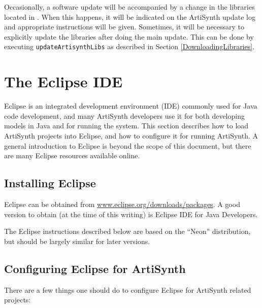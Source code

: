 Occasionally, a software update will be accompanied by a change in the
libraries located in .  When this happens, it will
be indicated on the ArtiSynth update log and appropriate instructions
will be given. Sometimes, it will be necessary to explicitly update
the libraries after doing the main update. This can be done by
executing {\tt updateArtisynthLibs} as described in
Section \ref{DownloadingLibraries}.

\section{The Eclipse IDE}
\label{EclipseIDE}

Eclipse is an integrated development environment (IDE) commonly used
for Java code development, and many ArtiSynth developers use it for
both developing models in Java and for running the system. This section
describes how to load ArtiSynth projects into Eclipse, and how to
configure it for running ArtiSynth. A general introduction to Eclipse
is beyond the scope of this document, but there are many Eclipse
resources available online.

\subsection{Installing Eclipse}

Eclipse can be obtained from
\href{http://www.eclipse.org/downloads/packages}%
{www.eclipse.org/downloads/packages}.  A
good version to obtain (at the time of this writing) is {\sf Eclipse
IDE for Java Developers}.

\begin{sideblock}
The Eclipse instructions described below are based on the ``Neon''
distribution, but should be largely similar for later versions.
\end{sideblock}

\subsection{Configuring Eclipse for ArtiSynth}
\label{ConfiguringEclipse}

There are a few things one should do to configure Eclipse for
ArtiSynth related projects:

